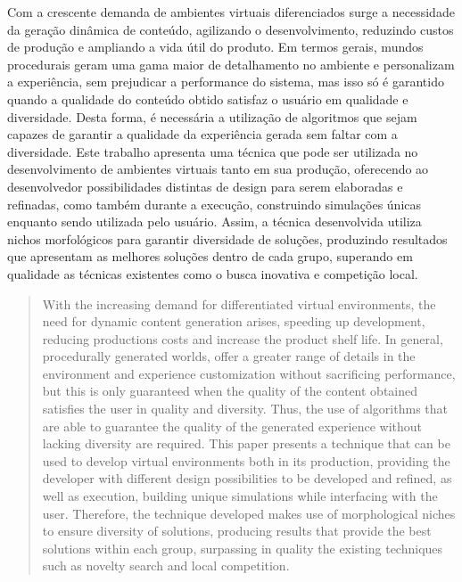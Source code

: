 \begin{resumo}

Com a crescente demanda de ambientes virtuais diferenciados surge a necessidade da geração dinâmica de conteúdo, agilizando o desenvolvimento, reduzindo custos de produção e ampliando a vida útil do produto. Em termos gerais, mundos procedurais geram uma gama maior de detalhamento no ambiente e personalizam a experiência, sem prejudicar a performance do sistema, mas isso só é garantido quando a qualidade do conteúdo obtido satisfaz o usuário em qualidade e diversidade. Desta forma, é necessária a utilização de algoritmos que sejam capazes de garantir a qualidade da experiência gerada sem faltar com a diversidade. Este trabalho apresenta uma técnica que pode ser utilizada no desenvolvimento de ambientes virtuais tanto em sua produção, oferecendo ao desenvolvedor possibilidades distintas de design para serem elaboradas e refinadas, como também durante a execução, construindo simulações únicas enquanto sendo utilizada pelo usuário. Assim, a técnica desenvolvida utiliza nichos morfológicos para garantir diversidade de soluções, produzindo resultados que apresentam as melhores soluções dentro de cada grupo, superando em qualidade as técnicas existentes como o busca inovativa e competição local.

\end{resumo}

\begin{abstract}

With the increasing demand for differentiated virtual environments, the need for dynamic content generation arises, speeding up development, reducing productions costs and increase the product shelf life. In general, procedurally generated worlds, offer a greater range of details in the environment and experience customization without sacrificing performance, but this is only guaranteed when the quality of the content obtained satisfies the user in quality and diversity. Thus, the use of algorithms that are able to guarantee the quality of the generated experience without lacking diversity are required. This paper presents a technique that can be used to develop virtual environments both in its production, providing the developer with different design possibilities to be developed and refined, as well as execution, building unique simulations while interfacing with the user. Therefore, the technique developed makes use of morphological niches to ensure diversity of solutions, producing results that provide the best solutions within each group, surpassing in quality the existing techniques such as novelty search and local competition.

\end{abstract}